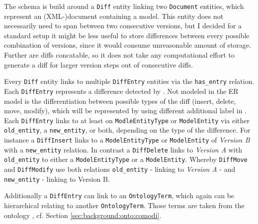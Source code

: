The schema is build around a \texttt{Diff} entity linking two \texttt{Document} entities, which represent an (XML-)document containing a model. This entity does not necessarily need to span between two consecutive versions, but I decided for a standard setup it might be less useful to store differences between every possible combination of versions, since it would consume unreasonable amount of storage. Further are diffs concatable, so it does not take any computational effort to generate a diff for larger version steps out of consecutive diffs.

Every \texttt{Diff} entity links to multiple \texttt{DiffEntry} entities via the \texttt{has\_entry} relation. Each \texttt{DiffEntry} represents a difference detected by \bives \cite{Scharm2015}. Not modeled in the ER model is the differentiation between possible types of the diff (insert, delete, move, modify), which will be represented by using different additional label in \neoj.
Each \texttt{DiffEntry} links to at least on \texttt{ModleEntityType} or \texttt{ModelEntity} via either \texttt{old\_entity}, a \texttt{new\_entity}, or both, depending on the type of the difference.
For instance a \texttt{DiffInsert} links to a \texttt{ModelEntityType} or \texttt{ModelEntity} of \emph{Version B} with a \texttt{new\_entity} relation.
In contrast a \texttt{DiffDelete} links to \emph{Version A} with \texttt{old\_entity} to either a \texttt{ModelEntityType} or a \texttt{ModelEntity}. Whereby \texttt{DiffMove} and \texttt{DiffModify} use both relations \texttt{old\_entity} - linking to \emph{Version A} - and \texttt{new\_entity} - linking to Version B.

Additionally a \texttt{DiffEntry} can link to an \texttt{OntologyTerm}, which again can be hierarchical relating to another \texttt{OntologyTerm}. Those terms are taken from the \comodi ontology \cite{Scharm2016}, cf. Section \ref{sec:background:onto:comodi}.

